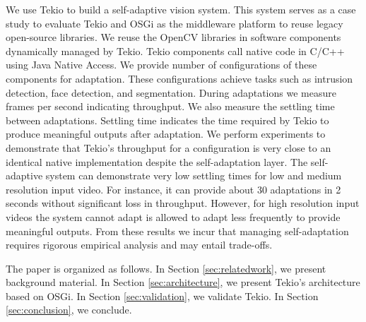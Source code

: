 \documentclass{acm_proc_article-sp}
\begin{document}
We use Tekio to build a self-adaptive vision system. This system serves as a case study to evaluate Tekio and OSGi as the middleware platform to reuse legacy open-source libraries. We reuse the OpenCV libraries in software components dynamically managed by Tekio. Tekio components call native code in C/C++ using Java Native Access. We provide number of configurations of these components for adaptation. These configurations achieve tasks such as intrusion detection, face detection, and segmentation. During adaptations we measure frames per second indicating throughput. We also measure the settling time between adaptations. Settling time indicates the time required by Tekio to produce meaningful outputs after adaptation. We perform experiments to demonstrate that Tekio's throughput for a configuration is very close to an identical native implementation despite the self-adaptation layer. The self-adaptive system can demonstrate very low settling times for low and medium resolution input video. For instance, it can provide about 30 adaptations in 2 seconds without significant loss in throughput. However, for high resolution input videos the system cannot adapt is allowed to adapt less frequently to provide meaningful outputs. From these results we incur that managing  self-adaptation requires rigorous empirical analysis and may entail trade-offs.

The paper is organized as follows. In Section \ref{sec:relatedwork}, we present background material. In Section \ref{sec:architecture}, we present Tekio's architecture based on OSGi. In Section \ref{sec:validation}, we validate Tekio. In Section \ref{sec:conclusion}, we conclude.

%















%

%
%
\end{document}
